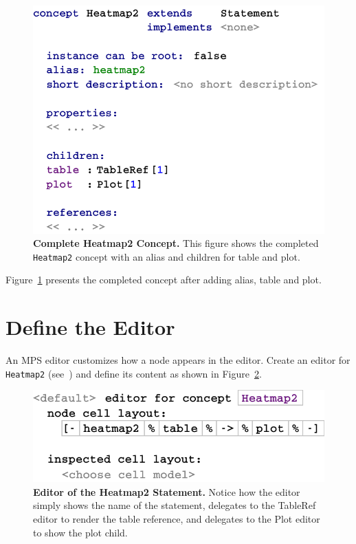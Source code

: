 \begin{figure}[htbp]
  \centering
  \includegraphics[width=\figWidthNarrow]{figures/Heatmap2Concept_Complete.pdf}
\caption[Complete Heatmap2 Concept.]{\textbf{Complete Heatmap2 Concept.} This figure shows the completed \texttt{Heatmap2} concept with an alias and children for table and plot.}
\label{fig:Heatmap2ConceptCompleted}
\end{figure}

Figure~\ref{fig:Heatmap2ConceptCompleted} presents the completed concept after adding alias, table and plot. 
\section{Define the Editor}
An MPS editor customizes how a node appears in the editor. Create an editor for \texttt{Heatmap2} (see~\cite{campagne2014mps}) and define its content as shown in Figure~\ref{fig:EditorForHeatmap2}.
\begin{figure}
  \centering
  \includegraphics[width=\figWidthNarrow]{figures/EditorForHeatmap2.pdf}
\caption[Editor of the Heatmap2 Statement.]{\textbf{Editor of the Heatmap2 Statement.} Notice how the editor simply shows the name of the statement, delegates to the TableRef editor to render the table reference, and delegates to the Plot editor to show the plot child.}
\label{fig:EditorForHeatmap2}
\end{figure}

